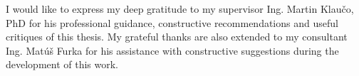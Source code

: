 I would like to express my deep gratitude to my supervisor Ing. Martin Klaučo, PhD for his professional guidance, constructive recommendations and useful critiques of this thesis. My grateful thanks are also extended to my consultant Ing. Matúš Furka for his assistance with constructive suggestions during the development of this work.
